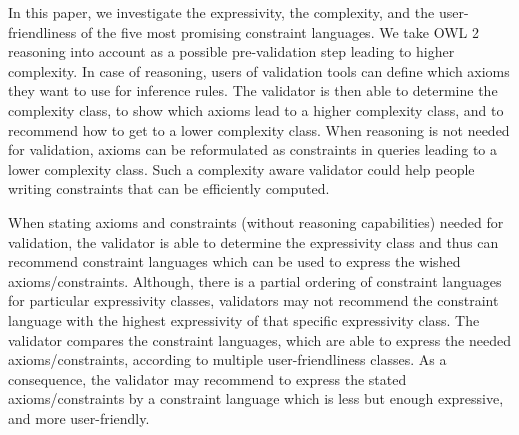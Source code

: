 \documentclass{llncs}
\begin{document}
In this paper, we investigate the expressivity, the complexity, and the user-friendliness of the five most promising constraint languages.
We take OWL 2 reasoning into account as a possible pre-validation step leading to higher complexity.
In case of reasoning, users of validation tools can define which axioms they want to use for inference rules.
The validator is then able to determine the complexity class, to show which axioms lead to a higher complexity class, and to recommend how to get to a lower complexity class.
When reasoning is not needed for validation, axioms can be reformulated as constraints in queries leading to a lower complexity class. 
Such a complexity aware validator could help people writing constraints that can be efficiently computed.

When stating axioms and constraints (without reasoning capabilities) needed for validation, 
the validator is able to determine the expressivity class and thus can recommend constraint languages which can be used to express the wished axioms/constraints. 
Although, there is a partial ordering of constraint languages for particular expressivity classes, 
validators may not recommend the constraint language with the highest expressivity of that specific expressivity class.
The validator compares the constraint languages, which are able to express the needed axioms/constraints, according to multiple user-friendliness classes.
As a consequence, the validator may recommend to express the stated axioms/constraints by a constraint language which is less but enough expressive, and more user-friendly.


\end{document}
